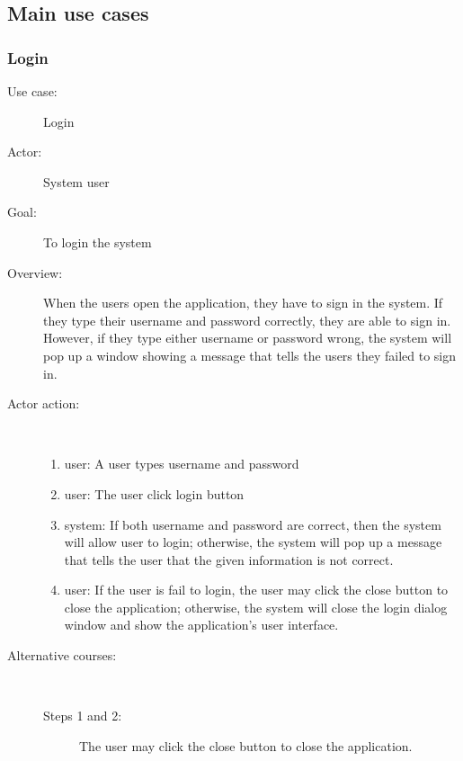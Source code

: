 \documentclass[11pt, oneside]{article}   	%
\begin{document}

\subsection{Main use cases}

\subsubsection{Login}
\begin{description}
\item[Use case:] Login
\item[Actor:] System user
\item[Goal:] To login the system
\item[Overview:] When the users open the application, they have to sign in the system. 
If they type their username and password correctly, they are able to sign in. 
However, if they type either username or password wrong, the system will pop up a window showing a message that tells the users they failed to sign in.
\item[Actor action:]
\
\begin{enumerate}
\item user: A user types username and password
\item user: The user click login button
\item system: If both username and password are correct, then the system will allow user to login; otherwise, the system will pop up a message that tells the user that the given information is not correct.
\item user: If the user is fail to login, the user may click the close button to close the application; otherwise, the system will close the login dialog window and show the application's user interface.
\end{enumerate}

\item[Alternative courses:]
\
\begin{description}
\item[Steps 1 and 2:] The user may click the close button to close the application.
\end{description}

\end{description}
\end{document}
